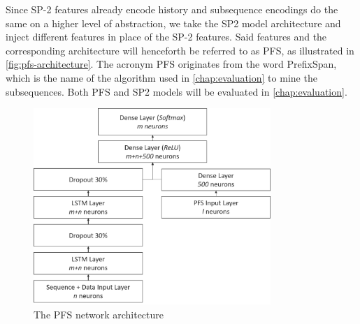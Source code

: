 Since SP-2 features already encode history and subsequence encodings do the same on a higher level of abstraction, we take the SP2 model architecture and inject different features in place of the SP-2 features. Said features and the corresponding architecture will henceforth be referred to as PFS, as illustrated in \autoref{fig:pfs-architecture}. The acronym PFS originates from the word PrefixSpan, which is the name of the algorithm used in \autoref{chap:evaluation} to mine the subsequences. Both PFS and SP2 models will be evaluated in \autoref{chap:evaluation}.

\begin{figure}[ht]
    \centering
    \includegraphics[width=0.8\textwidth]{gfx/pfs-network-architecture.png}
    \caption{The PFS network architecture}
    \label{fig:pfs-architecture}
\end{figure}
